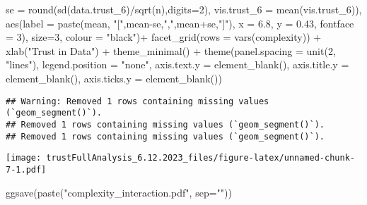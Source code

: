 \documentclass[
]{article}
\newenvironment{Shaded}{\begin{snugshade}}{\end{snugshade}}
\newcommand{\AttributeTok}[1]{\textcolor[rgb]{0.77,0.63,0.00}{#1}}
\newcommand{\DecValTok}[1]{\textcolor[rgb]{0.00,0.00,0.81}{#1}}
\newcommand{\FloatTok}[1]{\textcolor[rgb]{0.00,0.00,0.81}{#1}}
\newcommand{\FunctionTok}[1]{\textcolor[rgb]{0.00,0.00,0.00}{#1}}
\newcommand{\NormalTok}[1]{#1}
\newcommand{\SpecialCharTok}[1]{\textcolor[rgb]{0.00,0.00,0.00}{#1}}
\newcommand{\StringTok}[1]{\textcolor[rgb]{0.31,0.60,0.02}{#1}}
\begin{document}
\begin{Shaded}
\begin{Highlighting}[]
            \AttributeTok{se =} \FunctionTok{round}\NormalTok{(}\FunctionTok{sd}\NormalTok{(data.trust\_6)}\SpecialCharTok{/}\FunctionTok{sqrt}\NormalTok{(n),}\AttributeTok{digits=}\DecValTok{2}\NormalTok{),}
                          \AttributeTok{vis.trust\_6 =} \FunctionTok{mean}\NormalTok{(vis.trust\_6)),}
            \FunctionTok{aes}\NormalTok{(}\AttributeTok{label =} \FunctionTok{paste}\NormalTok{(mean, }\StringTok{"["}\NormalTok{,mean}\SpecialCharTok{{-}}\NormalTok{se,}\StringTok{","}\NormalTok{,mean}\SpecialCharTok{+}\NormalTok{se,}\StringTok{"]"}\NormalTok{), }\AttributeTok{x =} \FloatTok{6.8}\NormalTok{, }\AttributeTok{y =} \FloatTok{0.43}\NormalTok{, }\AttributeTok{fontface =} \DecValTok{3}\NormalTok{), }\AttributeTok{size=}\DecValTok{3}\NormalTok{, }\AttributeTok{colour =} \StringTok{"black"}\NormalTok{)}\SpecialCharTok{+}
  \FunctionTok{facet\_grid}\NormalTok{(}\AttributeTok{rows =} \FunctionTok{vars}\NormalTok{(complexity)) }\SpecialCharTok{+}
  \FunctionTok{xlab}\NormalTok{(}\StringTok{"Trust in Data"}\NormalTok{) }\SpecialCharTok{+}
  \FunctionTok{theme\_minimal}\NormalTok{() }\SpecialCharTok{+} 
  \FunctionTok{theme}\NormalTok{(}\AttributeTok{panel.spacing =} \FunctionTok{unit}\NormalTok{(}\DecValTok{2}\NormalTok{, }\StringTok{"lines"}\NormalTok{),}
        \AttributeTok{legend.position =} \StringTok{"none"}\NormalTok{,}
        \AttributeTok{axis.text.y =} \FunctionTok{element\_blank}\NormalTok{(),}
        \AttributeTok{axis.title.y =} \FunctionTok{element\_blank}\NormalTok{(),}
        \AttributeTok{axis.ticks.y =} \FunctionTok{element\_blank}\NormalTok{())}
\end{Highlighting}
\end{Shaded}

\begin{verbatim}
## Warning: Removed 1 rows containing missing values (`geom_segment()`).
## Removed 1 rows containing missing values (`geom_segment()`).
## Removed 1 rows containing missing values (`geom_segment()`).
\end{verbatim}

\texttt{[image: trustFullAnalysis\_6.12.2023\_files/figure-latex/unnamed-chunk-7-1.pdf]}

\begin{Shaded}
\begin{Highlighting}[]
\FunctionTok{ggsave}\NormalTok{(}\FunctionTok{paste}\NormalTok{(}\StringTok{"complexity\_interaction.pdf"}\NormalTok{, }\AttributeTok{sep=}\StringTok{""}\NormalTok{))}
\end{Highlighting}
\end{Shaded}
\end{document}
